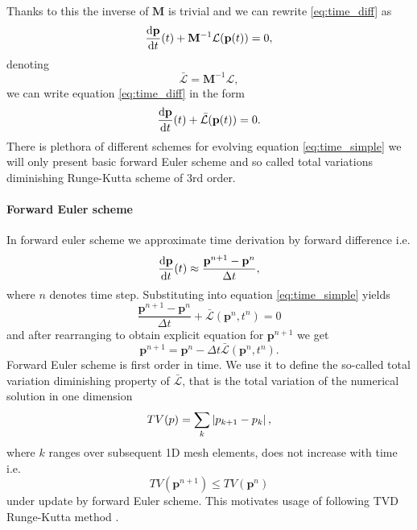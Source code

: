 Thanks to this the inverse of $\mathbf{M}$ is trivial and we can rewrite 
\eqref{eq:time_diff} as
\begin{equation}
	 \frac{\text{d}\mathbf{p}}{\text{d}t}(t) + \mathbf{M}^{-1}\mathcal{L}(\mathbf{p}(t)) = 0,
\end{equation}
denoting
\begin{equation}
	\bar{\mathcal{L}} =\mathbf{M}^{-1}\mathcal{L}, 
\end{equation}
we can write equation 
\eqref{eq:time_diff} in the form
\begin{equation}\label{eq:time_simple}
\frac{\text{d}\mathbf{p}}{\text{d}t}(t) + \bar{\mathcal{L}}(\mathbf{p}(t)) = 0.
\end{equation}
There is plethora of different schemes for evolving equation 
\eqref{eq:time_simple} we will only present basic forward Euler scheme and so called 
total variations diminishing Runge-Kutta scheme of 3rd order.


\paragraph{Forward Euler scheme} In forward euler scheme we approximate time 
derivation by forward difference i.e.
\begin{equation}
	\frac{\text{d}\mathbf{p}}{\text{d}t}(t) \approx 	\frac{\mathbf{p}^{n + 1} - 
	\mathbf{p}^{n}}{\Delta t},
\end{equation}
where $n$ denotes time step. Substituting into equation \eqref{eq:time_simple} 
yields
\begin{equation}
	\frac{\mathbf{p}^{n + 1} - \mathbf{p}^{n}}{\Delta t} + 
	 \bar{\mathcal{L}}(\mathbf{p}^n, t^n) = 0
\end{equation}
and after rearranging to obtain explicit equation for $\mathbf{p}^{n + 1}$ we 
get
\begin{equation}
\mathbf{p}^{n + 1} = \mathbf{p}^{n} - {\Delta t} 
\bar{\mathcal{L}}(\mathbf{p}^n, t^n).
\end{equation}
Forward Euler scheme is first order in time. We use it to define the so-called 
total variation diminishing property of $\bar{\mathcal{L}}$, that is the total 
variation of the numerical solution in one dimension
\begin{equation}\label{eq:TV}
	TV(p) = \sum_{k} \left\lvert p_{k + 1} - p_{k}\right\rvert,	
\end{equation}
where $k$ ranges over subsequent 1D mesh elements, does not increase with time i.e.
\begin{equation}
	TV(\mathbf{p}^{n + 1}) \leq TV(\mathbf{p}^{n})
\end{equation}
under update by forward Euler scheme.
This motivates usage of following TVD Runge-Kutta method \cite[p. 73]{Gottlieb2002}. 



